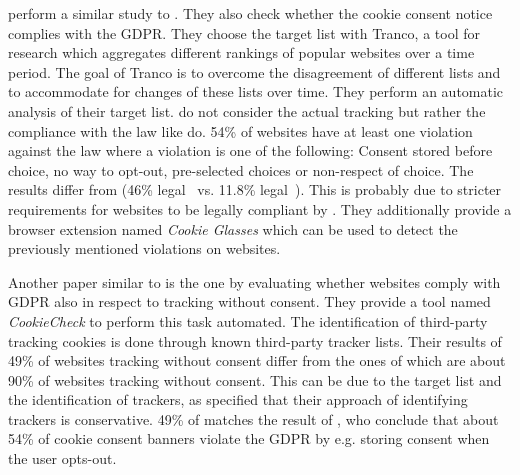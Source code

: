  perform a similar study to . They also check whether the cookie consent notice
complies with the GDPR. They choose the target list with Tranco, a tool for research which aggregates different rankings
of popular websites over a time period. The goal of Tranco is to overcome the disagreement of different lists and to accommodate
for changes of these lists over time. They perform an automatic analysis of their target list.
\citeauthor{matte2020cookie} do not consider the actual tracking but rather the compliance with the law
like \citeauthor{nouwens2020dark} do. 54\% of websites have at least one violation against the law where a violation is
one of the following: Consent stored before choice, no way to opt-out, pre-selected choices or non-respect of choice.
The results differ from \citeauthor{nouwens2020dark}(46\% legal~\cite{matte2020cookie} vs. 11.8\%
legal~\cite{nouwens2020dark}). This is probably due to stricter
requirements for websites to be legally compliant by \citeauthor{nouwens2020dark}.
They additionally provide a browser extension named \emph{Cookie Glasses} which can be used to detect the previously
mentioned violations on websites.

Another paper similar to  is the one by  evaluating whether websites comply
with GDPR also in respect to tracking without consent. They provide a tool named \emph{CookieCheck} to perform this task
automated. The identification of third-party tracking cookies is done through known third-party tracker lists. Their
results of 49\% of websites tracking without consent differ from the ones of \citeauthor{sanchez2019can} which are about
90\% of websites tracking without consent. This can be due to the target list and the identification of trackers,
as \citeauthor{sanchez2019can} specified that their approach of identifying trackers is conservative. 49\% of
\citeauthor{trevisan20194} matches the result of , who conclude that about 54\% of cookie consent
banners violate the GDPR by e.g. storing consent when the user opts-out.

